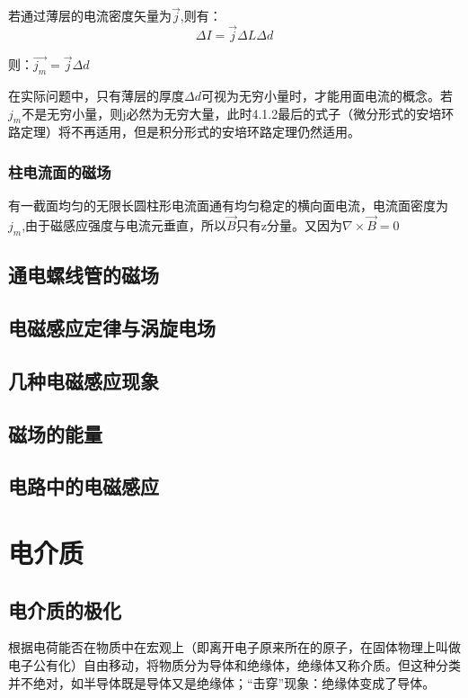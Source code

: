 \documentclass[11pt]{ctexart}
\begin{document}
若通过薄层的电流密度矢量为$\vec{j}$,则有：
\begin{equation}
    \varDelta I=\vec{j} \varDelta L \varDelta d
\end{equation}

则：$\vec{j_m}=\vec{j} \varDelta d$

在实际问题中，只有薄层的厚度$\varDelta d$可视为无穷小量时，才能用面电流的概念。若$j_m$不是无穷小量，则j必然为无穷大量，此时4.1.2最后的式子（微分形式的安培环路定理）将不再适用，但是积分形式的安培环路定理仍然适用。

\subsubsection{柱电流面的磁场}

有一截面均匀的无限长圆柱形电流面通有均匀稳定的横向面电流，电流面密度为$j_m$,由于磁感应强度与电流元垂直，所以$\vec{B}$只有z分量。又因为$\nabla \times \vec{B}=0$
\subsection{通电螺线管的磁场}

\subsection{电磁感应定律与涡旋电场}

\subsection{几种电磁感应现象}

\subsection{磁场的能量}

\subsection{电路中的电磁感应}





\section{电介质}

\subsection{电介质的极化}
根据电荷能否在物质中在宏观上（即离开电子原来所在的原子，在固体物理上叫做电子公有化）自由移动，将物质分为导体和绝缘体，绝缘体又称介质。但这种分类并不绝对，如半导体既是导体又是绝缘体；“击穿”现象：绝缘体变成了导体。
\end{document}

